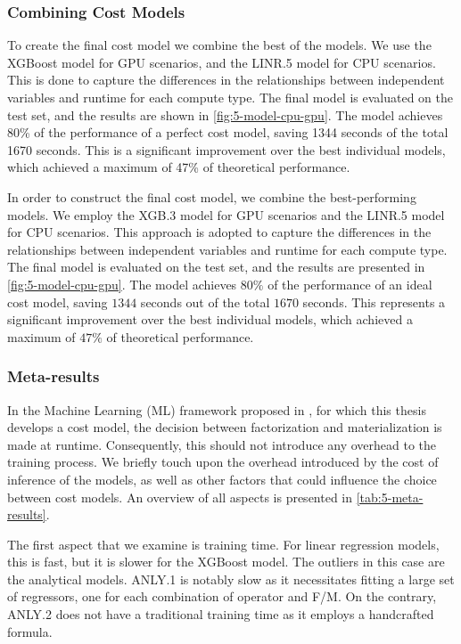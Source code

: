 \subsubsection{Combining Cost Models}
\label{subsec:5-hybrid}
To create the final cost model we combine the best of the models. We use the XGBoost model for GPU scenarios, and the LINR.5 model for CPU scenarios. This is done to capture the differences in the relationships between independent variables and runtime for each compute type. The final model is evaluated on the test set, and the results are shown in \autoref{fig:5-model-cpu-gpu}. The model achieves 80\% of the performance of a perfect cost model, saving 1344 seconds of the total 1670 seconds. This is a significant improvement over the best individual models, which achieved a maximum of 47\% of theoretical performance.

In order to construct the final cost model, we combine the best-performing models. We employ the XGB.3 model for GPU scenarios and the LINR.5 model for CPU scenarios. This approach is adopted to capture the differences in the relationships between independent variables and runtime for each compute type. The final model is evaluated on the test set, and the results are presented in \autoref{fig:5-model-cpu-gpu}. The model achieves $80\%$ of the performance of an ideal cost model, saving $1344$ seconds out of the total $1670$ seconds. This represents a significant improvement over the best individual models, which achieved a maximum of $47\%$ of theoretical performance.

\subsubsection{Meta-results}
In the Machine Learning (ML) framework proposed in \cite{amalur}, for which this thesis develops a cost model, the decision between factorization and materialization is made at runtime. Consequently, this should not introduce any overhead to the training process. We briefly touch upon the overhead introduced by the cost of inference of the models, as well as other factors that could influence the choice between cost models. An overview of all aspects is presented in \autoref{tab:5-meta-results}.

The first aspect that we examine is training time. For linear regression models, this is fast, but it is slower for the XGBoost model. The outliers in this case are the analytical models. ANLY.1 is notably slow as it necessitates fitting a large set of regressors, one for each combination of operator and F/M. On the contrary, ANLY.2 does not have a traditional training time as it employs a handcrafted formula.

